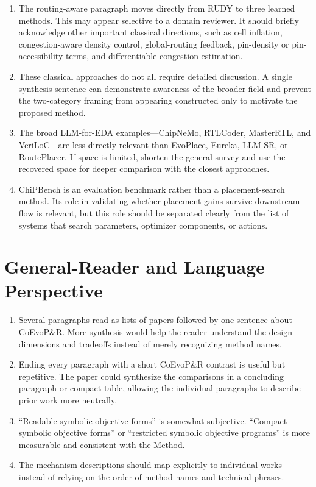 \documentclass[11pt]{article}
\begin{document}
\begin{enumerate}
  \item The routing-aware paragraph moves directly from RUDY to three learned
  methods. This may appear selective to a domain reviewer. It should briefly
  acknowledge other important classical directions, such as cell inflation,
  congestion-aware density control, global-routing feedback, pin-density or
  pin-accessibility terms, and differentiable congestion estimation.

  \item These classical approaches do not all require detailed discussion. A
  single synthesis sentence can demonstrate awareness of the broader field and
  prevent the two-category framing from appearing constructed only to motivate
  the proposed method.

  \item The broad LLM-for-EDA examples---ChipNeMo, RTLCoder, MasterRTL, and
  VeriLoC---are less directly relevant than EvoPlace, Eureka, LLM-SR, or
  RoutePlacer. If space is limited, shorten the general survey and use the
  recovered space for deeper comparison with the closest approaches.

  \item ChiPBench is an evaluation benchmark rather than a placement-search
  method. Its role in validating whether placement gains survive downstream
  flow is relevant, but this role should be separated clearly from the list of
  systems that search parameters, optimizer components, or actions.
\end{enumerate}

\section{General-Reader and Language Perspective}

\begin{enumerate}
  \item Several paragraphs read as lists of papers followed by one sentence
  about CoEvoP\&R. More synthesis would help the reader understand the design
  dimensions and tradeoffs instead of merely recognizing method names.

  \item Ending every paragraph with a short CoEvoP\&R contrast is useful but
  repetitive. The paper could synthesize the comparisons in a concluding
  paragraph or compact table, allowing the individual paragraphs to describe
  prior work more neutrally.

  \item ``Readable symbolic objective forms'' is somewhat subjective.
  ``Compact symbolic objective forms'' or ``restricted symbolic objective
  programs'' is more measurable and consistent with the Method.

  \item The mechanism descriptions should map explicitly to individual works
  instead of relying on the order of method names and technical phrases.
\end{enumerate}
\end{document}
